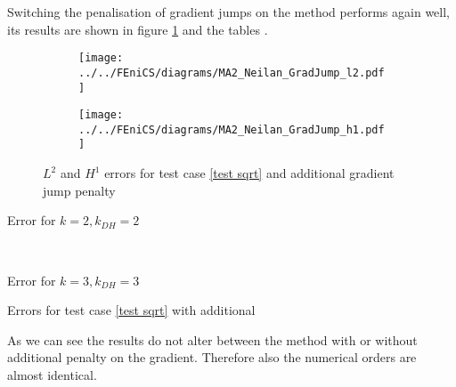 Switching the penalisation of gradient jumps on the method performs again well, its results are shown in figure \ref{fig: l2 errors test 2 jump} and the tables . 
\begin{figure}[H]
\centering
\begin{subfigure}{\textwidth}
\centering
	\texttt{[image: ../../FEniCS/diagrams/MA2\_Neilan\_GradJump\_l2.pdf]}
\end{subfigure}

\begin{subfigure}{\textwidth}
\centering
	\texttt{[image: ../../FEniCS/diagrams/MA2\_Neilan\_GradJump\_h1.pdf]}
\end{subfigure}
	\caption{$L^2$ and $H^1$ errors for test case \ref{test sqrt} and additional gradient jump penalty}
	\label{fig: l2 errors test 2 jump}
\end{figure}
\begin{table}[H]
	\begin{subtable}[b]{0.45\textwidth}
		\centering
		\pgfplotstabletypeset[
		columns={iterations, l2error, h1error,N},
		every row 0 column 0/.style={set content=init},
		]{\MATwoJumpdegTwoTwo}
		\caption{Error for $k=2, k_{DH}=2$}
	\end{subtable}
	~
	\begin{subtable}[b]{0.45\textwidth}
		\centering
		\pgfplotstabletypeset[columns={iterations, l2error, h1error,N},
		every row 0 column 0/.style={set content=init},
		]{\MATwoJumpdegThreeThree}
		\caption{Error for $k=3, k_{DH}=3$}
	\end{subtable}
	\caption{Errors for test case \ref{test sqrt} with additional }
	\label{tab: l2 errors test 2 jump}
\end{table}

As we can see the results do not alter between the method with or without additional penalty on the gradient. Therefore also the numerical orders are almost identical.  
